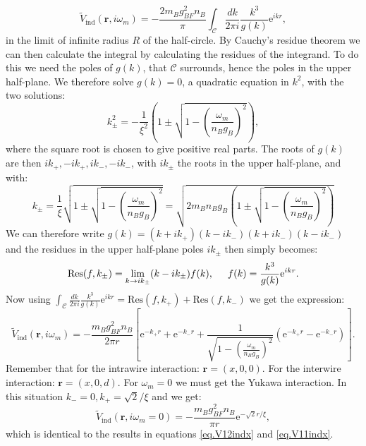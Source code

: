\begin{equation}
\tilde{V}_{\text{ind}}(\mathbf{r}, i\omega_m) = -\frac{2m_Bg^2_{BF}n_B}{\pi}\int_{\mathcal{C}} \frac{dk}{2\pi i} \frac{k^3}{g(k)}\text{e}^{ikr}, \nonumber
\end{equation}
in the limit of infinite radius $R$ of the half-circle. By Cauchy's residue theorem we can then calculate the integral by calculating the residues of the integrand. To do this we need the poles of $g(k)$, that $\mathcal{C}$ surrounds, hence the poles in the upper half-plane. We therefore solve $g(k) = 0$, a quadratic equation in $k^2$, with the two solutions:
\begin{equation}
k^2_{\pm} = -\frac{1}{\xi^2}\left(1 \pm \sqrt{1 - \left(\frac{\omega_m}{n_Bg_B}\right)^2}\right), \nonumber
\end{equation} 
where the square root is chosen to give positive real parts. The roots of $g(k)$ are then $ik_+, -ik_+, ik_-, -ik_-$, with $ik_{\pm}$ the roots in the upper half-plane, and with: 
\begin{equation}
k_{\pm} = \frac{1}{\xi}\sqrt{1\pm \sqrt{1 - \left(\frac{\omega_m}{n_Bg_B}\right)^2}} = \sqrt{ 2m_Bn_Bg_B\left( 1 \pm \sqrt{1 - \left(\frac{\omega_m}{n_Bg_B}\right)^2 } \right) }
\label{eq.polesVindxomegam}
\end{equation}
We can therefore write $g(k) = (k + ik_+)(k - ik_-)(k + ik_-)(k - ik_-)$ and the residues in the upper half-plane poles $ik_{\pm}$ then simply becomes:
\begin{equation}
\text{Res}(f, k_{\pm}) = \lim_{k\to ik_{\pm}} (k - ik_{\pm})f(k), \hspace{0.5cm} f(k) = \frac{k^3}{g(k)}\text{e}^{ikr}. \nonumber
\end{equation}
Now using $\int_{\mathcal{C}} \frac{dk}{2\pi i} \frac{k^3}{g(k)}\text{e}^{ikr} = \text{Res}(f, k_+) + \text{Res}(f, k_-)$ we get the expression:
\begin{equation}
\tilde{V}_{\text{ind}}(\mathbf{r}, i\omega_m) = -\frac{m_Bg^2_{BF}n_B}{2\pi r}\left[ \text{e}^{-k_+r} + \text{e}^{-k_-r} + \frac{1}{ \sqrt{1 - \left(\frac{\omega_m}{n_Bg_B}\right)^2} }\left(\text{e}^{-k_+r} - \text{e}^{-k_-r}  \right) \right]. \nonumber
\end{equation}
Remember that for the intrawire interaction: $\mathbf{r} = (x, 0, 0)$. For the interwire interaction: $\mathbf{r} = (x, 0, d)$. For $\omega_m = 0$ we must get the Yukawa interaction. In this situation $k_- = 0, k_+ = \sqrt{2}/\xi$ and we get:
\begin{equation}
\tilde{V}_{\text{ind}}(\mathbf{r}, i\omega_m = 0) = -\frac{m_Bg^2_{BF}n_B}{\pi r}\text{e}^{-\sqrt{2}r/\xi}, \nonumber
\end{equation}
which is identical to the results in equations \eqref{eq.V12indx} and \eqref{eq.V11indx}. 

